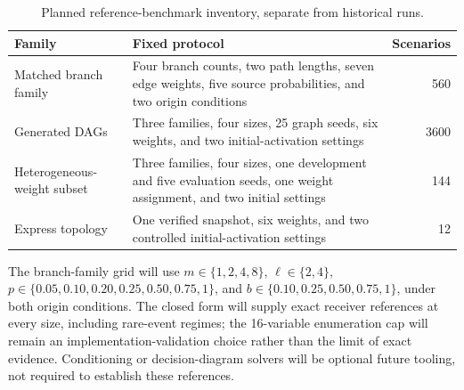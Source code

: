 \begin{table}[H]
\centering
\caption{Planned reference-benchmark inventory, separate from historical runs.}
\label{tab:reference-inventory}
\small
\begin{tabularx}{\textwidth}{@{}L L r@{}}
\toprule
Family & Fixed protocol & Scenarios\\
\midrule
Matched branch family & Four branch counts, two path lengths, seven
edge weights, five source probabilities, and two origin conditions & 560\\
Generated DAGs & Three families, four sizes, 25 graph seeds, six weights,
and two initial-activation settings & 3600\\
Heterogeneous-weight subset & Three families, four sizes, one development
and five evaluation seeds, one weight assignment, and two initial settings & 144\\
Express topology & One verified snapshot, six weights, and two controlled
initial-activation settings & 12\\
\bottomrule
\end{tabularx}
\end{table}

The branch-family grid will use $m\in\{1,2,4,8\}$,
$\ell\in\{2,4\}$, $p\in\{0.05,0.10,0.20,0.25,0.50,0.75,1\}$,
and $b\in\{0.10,0.25,0.50,0.75,1\}$, under both origin conditions.
The closed form will supply exact receiver references at every size,
including rare-event regimes; the 16-variable enumeration cap will remain
an implementation-validation choice rather than the limit of exact evidence.
Conditioning or decision-diagram solvers will be optional future tooling,
not required to establish these references.


